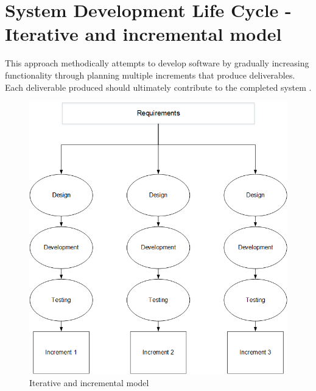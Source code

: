 \section{System Development Life Cycle - Iterative and incremental model}

This approach methodically attempts to develop software by gradually increasing functionality through planning multiple increments that produce deliverables. Each deliverable produced should ultimately contribute to the completed system \citep{IterativeModel}. 


    
    \begin{figure}[htbp!] 
    \centering    
    \includegraphics[width=1.0\textwidth]{Chapter3/Figs/Figure3-1.png}
    \caption[Iterative and incremental model]{Iterative and incremental model}
    \label{fig:Iterative and incremental model}
    \end{figure}
    
